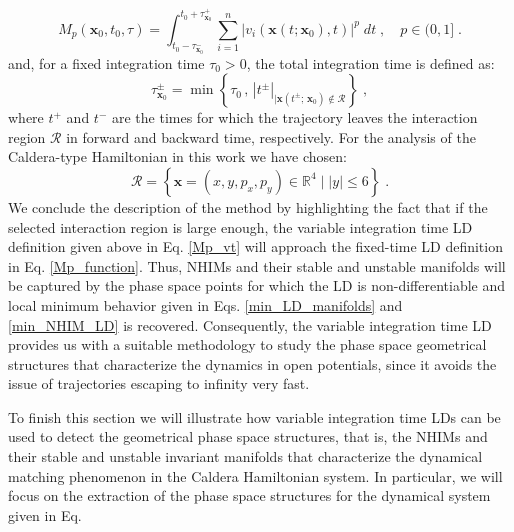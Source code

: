 \documentclass[8pt]{article}
\begin{document}
\bigskip
\bigskip

\begin{equation}
M_p(\mathbf{x}_{0},t_0,\tau) = \int^{t_0 + \tau^{+}_{\mathbf{x}_0}}_{t_0 - \tau^{-}_{\mathbf{x}_0}} \sum_{i=1}^{n} |v_{i}(\mathbf{x}(t;\mathbf{x}_0),t)|^p \; dt \;,\quad p \in (0,1] \;.
\label{Mp_vt}
\end{equation}
and, for a fixed integration time $\tau_0 > 0$, the total integration time is defined as:
\begin{equation}
\tau^{\pm}_{\mathbf{x}_{0}} = \min \left\lbrace \tau_0 \, , \, |t^{\pm}|_{\big| \mathbf{x}\left(t^{\pm}; \, \mathbf{x}_{0}\right) \notin \mathcal{R}} \right\rbrace \; ,
\end{equation}
where $t^{+}$ and $t^{-}$ are the times for which the trajectory leaves the interaction region $\mathcal{R}$ in forward and backward time, respectively. For the analysis of the Caldera-type Hamiltonian in this work we have chosen:
\begin{equation}
\mathcal{R} = \left\lbrace \mathbf{x} = (x,y,p_x,p_y) \in \mathbb{R}^4 \; \big| \; |y| \leq 6 \right\rbrace \;.
\label{inter_reg}
\end{equation}
We conclude the description of the method by highlighting the fact  that if the selected interaction region is large enough, the variable integration time LD definition given above in Eq. \eqref{Mp_vt} will approach the fixed-time LD definition in Eq. \eqref{Mp_function}. Thus, NHIMs and their stable and unstable manifolds will be captured by the phase space points for which the LD is non-differentiable and local minimum behavior given in Eqs. \eqref{min_LD_manifolds} and \eqref{min_NHIM_LD} is recovered. Consequently, the variable integration time LD provides us with a suitable methodology to study the phase space geometrical structures that characterize the dynamics in open potentials, since it avoids the issue of trajectories escaping to infinity very fast.

To finish this section we will illustrate how variable integration time LDs can be used to detect the geometrical phase space structures, that is, the NHIMs and their stable and unstable invariant manifolds that characterize the dynamical matching phenomenon in the Caldera Hamiltonian system. In particular, we will focus on the extraction of the phase space structures for the dynamical system given in Eq. 
\end{document}
